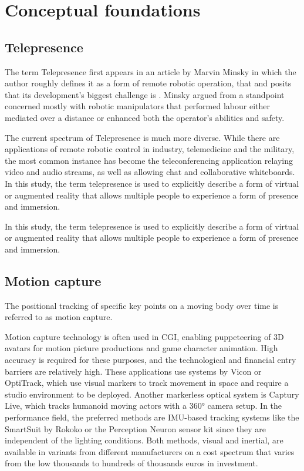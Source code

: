 \chapter{Conceptual foundations}
\label{chapter:conceptualFoundations}

\section{Telepresence}

The term Telepresence first appears in an article by Marvin Minsky in which the author roughly defines it as a form of remote robotic operation, that  and posits that its development's biggest challenge is  \parencite{minskyTelepresence}. Minsky argued from a standpoint concerned mostly with robotic manipulators that performed labour either mediated over a distance or enhanced both the operator's abilities and safety.

The current spectrum of Telepresence is much more diverse. While there are applications of remote robotic control in industry, telemedicine and the military, the most common instance has become the teleconferencing application relaying video and audio streams, as well as allowing chat and collaborative whiteboards. In this study, the term telepresence is used to explicitly describe a form of virtual or augmented reality that allows multiple people to experience a form of presence and immersion.

In this study, the term telepresence is used to explicitly describe a form of virtual or augmented reality that allows multiple people to experience a form of presence and immersion.

\section{Motion capture}

The positional tracking of specific key points on a moving body over time is referred to as motion capture.

Motion capture technology is often used in CGI, enabling puppeteering of 3D avatars for motion picture productions and game character animation. High accuracy is required for these purposes, and the technological and financial entry barriers are relatively high. These applications use systems by Vicon or OptiTrack, which use visual markers to track movement in space and require a studio environment to be deployed. Another markerless optical system is Captury Live, which tracks humanoid moving actors with a 360° camera setup. In the performance field, the preferred methods are IMU-based tracking systems like the SmartSuit by Rokoko or the Perception Neuron sensor kit since they are independent of the lighting conditions. Both methods, visual and inertial, are available in variants from different manufacturers on a cost spectrum that varies from the low thousands to hundreds of thousands euros in investment.

